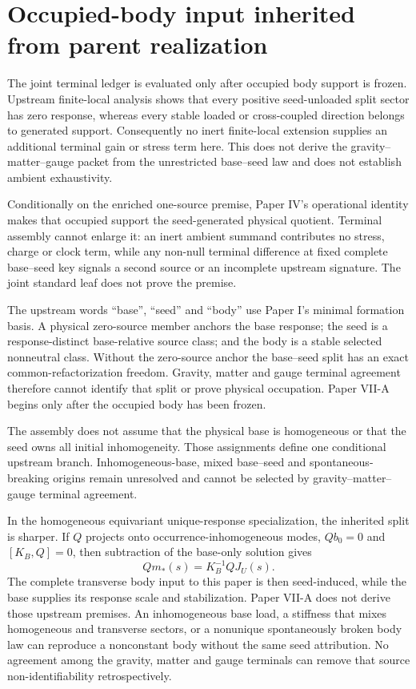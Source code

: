 \documentclass[11pt]{article}
\begin{document}
\section{Occupied-body input inherited from parent realization}

The joint terminal ledger is evaluated only after occupied body support is
frozen. Upstream finite-local analysis shows that every positive
seed-unloaded split sector has zero response, whereas every stable loaded or
cross-coupled direction belongs to generated support. Consequently no inert
finite-local extension supplies an additional terminal gain or stress term
here. This does not derive the gravity--matter--gauge packet from the
unrestricted base--seed law and does not establish ambient exhaustivity.

Conditionally on the enriched one-source premise, Paper IV's operational
identity makes that occupied support the seed-generated physical quotient.
Terminal assembly cannot enlarge it: an inert ambient summand contributes no
stress, charge or clock term, while any non-null terminal difference at fixed
complete base--seed key signals a second source or an incomplete upstream
signature. The joint standard leaf does not prove the premise.

The upstream words ``base'', ``seed'' and ``body'' use Paper I's minimal
formation basis.  A physical zero-source member anchors the base response; the
seed is a response-distinct base-relative source class; and the body is a
stable selected nonneutral class.  Without the zero-source anchor the
base--seed split has an exact common-refactorization freedom.  Gravity, matter
and gauge terminal agreement therefore cannot identify that split or prove
physical occupation.  Paper VII-A begins only after the occupied body has
been frozen.

The assembly does not assume that the physical base is homogeneous or that
the seed owns all initial inhomogeneity. Those assignments define one
conditional upstream branch. Inhomogeneous-base, mixed base--seed and
spontaneous-breaking origins remain unresolved and cannot be selected by
gravity--matter--gauge terminal agreement.

In the homogeneous equivariant unique-response specialization, the inherited
split is sharper. If $Q$ projects onto occurrence-inhomogeneous modes,
$Qb_0=0$ and $[K_B,Q]=0$, then subtraction of the base-only solution gives
\begin{equation}
 \boxed{Qm_*(s)=K_B^{-1}QJ_U(s).}
 \label{eq:paper-vii-seed-localization}
\end{equation}
The complete transverse body input to this paper is then seed-induced, while
the base supplies its response scale and stabilization. Paper VII-A does not
derive those upstream premises. An inhomogeneous base load, a stiffness that
mixes homogeneous and transverse sectors, or a nonunique spontaneously broken
body law can reproduce a nonconstant body without the same seed attribution.
No agreement among the gravity, matter and gauge terminals can remove that
source non-identifiability retrospectively.
\end{document}
